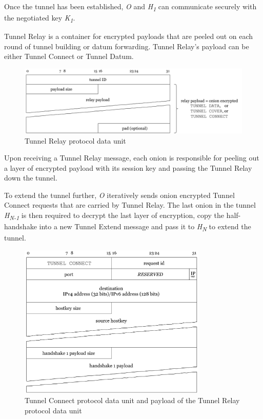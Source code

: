 \documentclass{article}
\begin{document}
Once the tunnel has been established, \textit{O} and \textit{H\textsubscript{1}} can communicate securely with the negotiated key \textit{K\textsubscript{1}}.

Tunnel Relay is a container for encrypted payloads that are peeled out on each round of tunnel building or datum forwarding. Tunnel Relay's payload can be either Tunnel Connect or Tunnel Datum.
\begin{figure}[H]
\centering
     \includegraphics[width=1\textwidth]{tunnel-relay.pdf}
      \caption{Tunnel Relay protocol data unit}
\end{figure}

Upon receiving a Tunnel Relay message, each onion is responsible for peeling out a layer of encrypted payload with its session key and passing the Tunnel Relay down the tunnel.

To extend the tunnel further, \textit{O} iteratively sends onion encrypted Tunnel Connect requests that are carried by Tunnel Relay. The last onion in the tunnel \textit{H\textsubscript{N-1}} is then required to decrypt the last layer of encryption, copy the half-handshake into a new Tunnel Extend message and pass it to \textit{H\textsubscript{N}} to extend the tunnel. 

\begin{figure}[H]
\centering
  \includegraphics[width=0.8\textwidth]{tunnel-connect.pdf}
  \captionsetup{justification=centering}
  \caption{Tunnel Connect protocol data unit and payload of the Tunnel Relay protocol data unit}
\end{figure}
\end{document}
